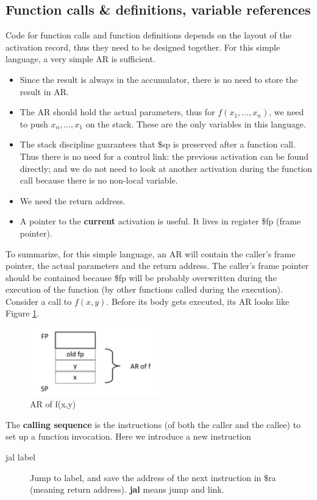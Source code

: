 \subsection{Function calls \& definitions, variable references}
Code for function calls and function definitions depends on the layout of the activation record, thus they need to be designed together. For this simple language, a very simple AR is sufficient. 
\begin{itemize}
\item Since the result is always in the accumulator, there is no need to store the result in AR. 
\item The AR should hold the actual parameters, thus for $f(x_1,\dots,x_n)$, we need to push $x_n,\dots,x_1$ on the stack. These are the only variables in this language. 
\item The stack discipline guarantees that \$sp is preserved after a function call. Thus there is no need for a control link: the previous activation can be found directly; and we do not need to look at another activation during the function call because there is no non-local variable. 
\item We need the return address.
\item A pointer to the \textbf{current} activation is useful. It lives in register \$fp (frame pointer).
\end{itemize}
To summarize, for this simple language, an AR will contain the caller's frame pointer, the actual parameters and the return address. The caller's frame pointer should be contained because \$fp will be probably overwritten during the execution of the function (by other functions called during the execution). Consider a call to $f(x,y)$. Before its body gets executed, its AR looks like Figure \ref{aroff}.
\begin{figure}[ht]
\centering
\includegraphics[width=0.5\textwidth]{aroff.jpg}
\caption{AR of f(x,y)}\label{aroff}
\end{figure}
The \textbf{calling sequence} is the instructions (of both the caller and the callee) to set up a function invocation. Here we introduce a new instruction
\begin{description}
\item[jal label] Jump to label, and save the address of the next instruction in \$ra (meaning return address). \textbf{jal} means jump and link.
\end{description}
